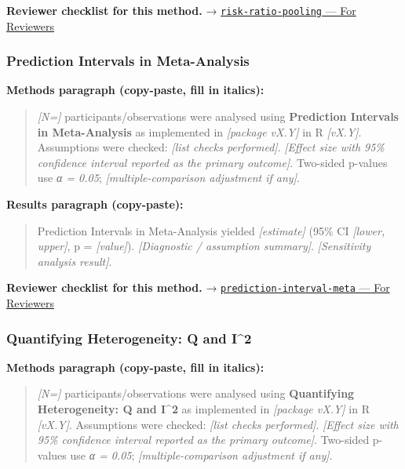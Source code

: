 \documentclass[
]{article}
\begin{document}
\textbf{Reviewer checklist for this method.} →
\href{../chapters/15-metaanalysis/risk-ratio-pooling.Rmd\#for-reviewers}{\texttt{risk-ratio-pooling}
--- For Reviewers}

\subsubsection{Prediction Intervals in
Meta-Analysis}\label{prediction-intervals-in-meta-analysis}

\textbf{Methods paragraph (copy-paste, fill in italics):}

\begin{quote}
\emph{{[}N={]}} participants/observations were analysed using
\textbf{Prediction Intervals in Meta-Analysis} as implemented in
\emph{{[}package vX.Y{]}} in R \emph{{[}vX.Y{]}}. Assumptions were
checked: \emph{{[}list checks performed{]}}. \emph{{[}Effect size with
95\% confidence interval reported as the primary outcome{]}}. Two-sided
p-values use \emph{α = 0.05}; \emph{{[}multiple-comparison adjustment if
any{]}}.
\end{quote}

\textbf{Results paragraph (copy-paste):}

\begin{quote}
Prediction Intervals in Meta-Analysis yielded \emph{{[}estimate{]}}
(95\% CI \emph{{[}lower, upper{]}}, p = \emph{{[}value{]}}).
\emph{{[}Diagnostic / assumption summary{]}}. \emph{{[}Sensitivity
analysis result{]}}.
\end{quote}

\textbf{Reviewer checklist for this method.} →
\href{../chapters/15-metaanalysis/prediction-interval-meta.Rmd\#for-reviewers}{\texttt{prediction-interval-meta}
--- For Reviewers}

\subsubsection{Quantifying Heterogeneity: Q and
I\^{}2}\label{quantifying-heterogeneity-q-and-i2}

\textbf{Methods paragraph (copy-paste, fill in italics):}

\begin{quote}
\emph{{[}N={]}} participants/observations were analysed using
\textbf{Quantifying Heterogeneity: Q and I\^{}2} as implemented in
\emph{{[}package vX.Y{]}} in R \emph{{[}vX.Y{]}}. Assumptions were
checked: \emph{{[}list checks performed{]}}. \emph{{[}Effect size with
95\% confidence interval reported as the primary outcome{]}}. Two-sided
p-values use \emph{α = 0.05}; \emph{{[}multiple-comparison adjustment if
any{]}}.
\end{quote}
\end{document}

